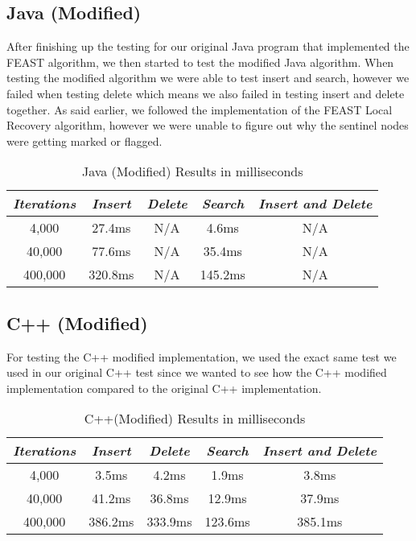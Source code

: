 \documentclass[conference]{IEEEtran}
\begin{document}
\subsection{Java (Modified)}\label{AA}
After finishing up the testing for our original Java program that implemented the FEAST algorithm, we then started to test the modified Java algorithm. When testing the modified algorithm we were able to test insert and search, however we failed when testing delete which means we also failed in testing insert and delete together. As said earlier, we followed the implementation of the FEAST Local Recovery algorithm, however we were unable to figure out why the sentinel nodes were getting marked or flagged. 

\begin{table}[htbp]
\caption{Java (Modified) Results in milliseconds}
\begin{center}
\begin{tabular}{|c|c|c|c|c|}
\hline
\cline{2-6} 
\textbf{\textit{Iterations}}& \textbf{\textit{Insert}}& \textbf{\textit{Delete}}& \textbf{\textit{Search}}& \textbf{\textit{Insert and Delete}}\\
\hline
4,000& 27.4ms& N/A& 4.6ms& N/A  \\
\hline
40,000& 77.6ms& N/A& 35.4ms& N/A \\
\hline
400,000& 320.8ms& N/A& 145.2ms& N/A \\
\hline
\end{tabular}
\label{tab1}
\end{center}
\end{table}

\subsection{C++ (Modified)}\label{AA}
For testing the C++ modified implementation, we used the exact same test we used in our original C++ test since we wanted to see how the C++ modified implementation compared to the original C++ implementation. 

\begin{table}[htbp]
\caption{C++(Modified) Results in milliseconds}
\begin{center}
\begin{tabular}{|c|c|c|c|c|}
\hline
\cline{2-6} 
\textbf{\textit{Iterations}}& \textbf{\textit{Insert}}& \textbf{\textit{Delete}}& \textbf{\textit{Search}}& \textbf{\textit{Insert and Delete}}\\
\hline
4,000& 3.5ms& 4.2ms& 1.9ms& 3.8ms  \\
\hline
40,000& 41.2ms& 36.8ms& 12.9ms& 37.9ms  \\
\hline
400,000& 386.2ms& 333.9ms& 123.6ms& 385.1ms \\
\hline
\end{tabular}
\label{tab1}
\end{center}
\end{table}
\end{document}
